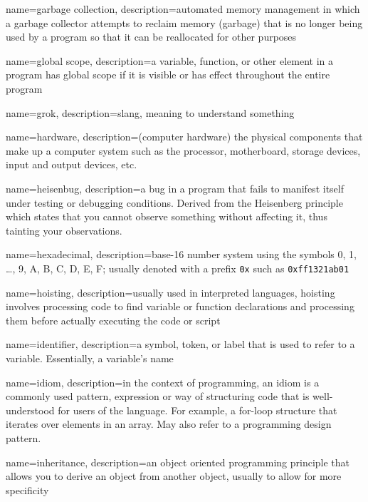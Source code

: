 {
  name=garbage collection,
  description={automated memory management in which a garbage collector attempts to reclaim memory (garbage) that is no
	longer being used by a program so that it can be reallocated for other purposes}
}

{
  name=global scope,
  description={a variable, function, or other element in a program has global scope if it is visible or has effect throughout
  	the entire program}
}

{
  name=grok,
  description={slang, meaning to understand something}
}

{
  name=hardware,
  description={(computer hardware) the physical components that make up a computer system such as the processor, motherboard, storage devices, input and output devices, etc.}
}

{
  name=heisenbug,
  description={a bug in a program that fails to manifest itself under testing or debugging conditions.  Derived from the Heisenberg principle which states that you cannot observe something without affecting it, thus tainting your observations.}
}

{
  name=hexadecimal,
  description={base-16 number system using the symbols 0, 1, \ldots, 9, A, B, C, D, E, F; usually denoted with a prefix \texttt{0x} such as
\texttt{0xff1321ab01}}
}


{
  name=hoisting,
  description={usually used in interpreted languages, hoisting involves processing code to find variable or function declarations and processing them before actually executing the code or script}
}

{
  name=identifier,
  description={a symbol, token, or label that is used to refer to a variable.  Essentially, a variable's name}
}

{
  name=idiom,
  description={in the context of programming, an idiom is a commonly used pattern, expression or way of structuring code that is well-understood for users of the language.  For example, a for-loop structure that iterates over elements in an array.  May also refer to a programming design pattern.}
}

{
  name=inheritance,
  description={an object oriented programming principle that allows you to derive an object from another object, usually to allow for more specificity}
}


